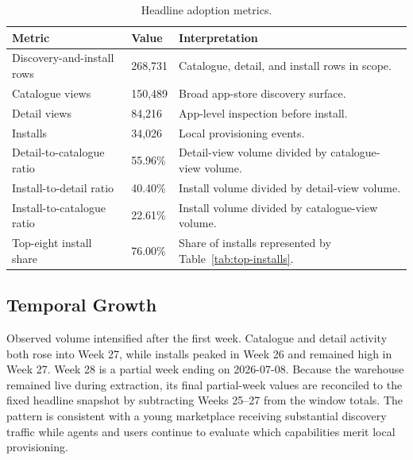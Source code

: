 \documentclass[10pt,twocolumn]{article}
\begin{document}
\begin{table}[!t]
\centering
\caption{Headline adoption metrics.}
\label{tab:headline}
\begin{tabularx}{\textwidth}{@{}Y R{1.35in} Y@{}}
\toprule
\textbf{Metric} & \textbf{Value} & \textbf{Interpretation} \\
\midrule
Discovery-and-install rows & 268,731 & Catalogue, detail, and install rows in scope. \\
Catalogue views & 150,489 & Broad app-store discovery surface. \\
Detail views & 84,216 & App-level inspection before install. \\
Installs & 34,026 & Local provisioning events. \\
Detail-to-catalogue ratio & 55.96\% & Detail-view volume divided by catalogue-view volume. \\
Install-to-detail ratio & 40.40\% & Install volume divided by detail-view volume. \\
Install-to-catalogue ratio & 22.61\% & Install volume divided by catalogue-view volume. \\
Top-eight install share & 76.00\% & Share of installs represented by Table~\ref{tab:top-installs}. \\
\bottomrule
\end{tabularx}
\end{table}

\subsection{Temporal Growth}

Observed volume intensified after the first week. Catalogue and detail activity both rose into Week 27, while installs peaked in Week 26 and remained high in Week 27. Week 28 is a partial week ending on 2026-07-08. Because the warehouse remained live during extraction, its final partial-week values are reconciled to the fixed headline snapshot by subtracting Weeks 25--27 from the window totals. The pattern is consistent with a young marketplace receiving substantial discovery traffic while agents and users continue to evaluate which capabilities merit local provisioning.
\end{document}
